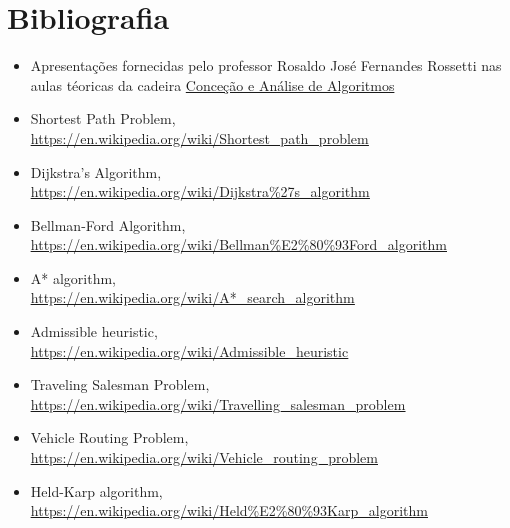 \documentclass[article, a4paper, 12pt, oneside]{memoir}
\begin{document}
\newpage
\chapter{Bibliografia}
\begin{itemize}
	\item Apresentações fornecidas pelo professor Rosaldo José Fernandes Rossetti nas aulas téoricas da cadeira \href{https://sigarra.up.pt/feup/pt/ucurr_geral.ficha_uc_view?pv_ocorrencia_id=436441}{Conceção e Análise de Algoritmos}
	\item Shortest Path Problem,\\
	\color{blue} \underline{\href{https://en.wikipedia.org/wiki/Shortest_path_problem}{https://en.wikipedia.org/wiki/Shortest\_path\_problem}} \color{black}
	\item Dijkstra's Algorithm,\\
	\color{blue} \underline{\href{https://en.wikipedia.org/wiki/Dijkstra\%27s_algorithm}{https://en.wikipedia.org/wiki/Dijkstra\%27s\_algorithm}} \color{black}
	\item Bellman-Ford Algorithm,\\
	\color{blue} \underline{\href{https://en.wikipedia.org/wiki/Bellman\%E2\%80\%93Ford_algorithm}{https://en.wikipedia.org/wiki/Bellman\%E2\%80\%93Ford\_algorithm}} \color{black}
	\item A* algorithm,\\
	\color{blue} \underline{\href{https://en.wikipedia.org/wiki/A*_search_algorithm}{https://en.wikipedia.org/wiki/A*\_search\_algorithm}} \color{black}
	\item Admissible heuristic,\\
	\color{blue} \underline{\href{https://en.wikipedia.org/wiki/Admissible_heuristic}{https://en.wikipedia.org/wiki/Admissible\_heuristic}} \color{black}
	\item Traveling Salesman Problem,\\
	\color{blue} \underline{\href{https://en.wikipedia.org/wiki/Travelling_salesman_problem}{https://en.wikipedia.org/wiki/Travelling\_salesman\_problem}} \color{black}
	\item Vehicle Routing Problem,\\
	\color{blue} \underline{\href{https://en.wikipedia.org/wiki/Vehicle_routing_problem}{https://en.wikipedia.org/wiki/Vehicle\_routing\_problem}} \color{black}
	\item Held-Karp algorithm,\\
	\color{blue} \underline{\href{https://en.wikipedia.org/wiki/Held\%E2\%80\%93Karp_algorithm}{https://en.wikipedia.org/wiki/Held\%E2\%80\%93Karp\_algorithm}} \color{black}

\end{itemize}
\end{document}
